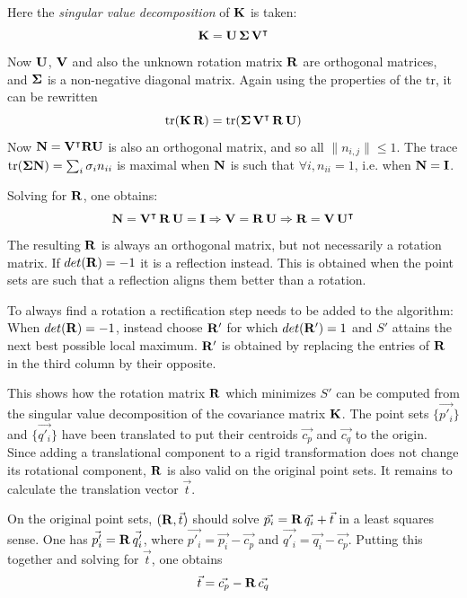 Here the \emph{singular value decomposition} of $\mathbf{K}$ is taken:
\begin{equation}
\mathbf{K} = \mathbf{U} \, \mathbf{\Sigma} \, \mathbf{V}^\intercal
\end{equation}
Now $\mathbf{U}$, $\mathbf{V}$ and also the unknown rotation matrix $\mathbf{R}$ are orthogonal matrices, and $\mathbf{\Sigma}$ is a non-negative diagonal matrix. Again using the properties of the $\text{tr}$, it can be rewritten
\begin{equation}
\text{tr}(\mathbf{K} \, \mathbf{R}) = \text{tr}(\mathbf{\Sigma} \, \mathbf{V}^\intercal \, \mathbf{R} \, \mathbf{U})
\end{equation}
Now $\mathbf{N} = \mathbf{V}^\intercal \mathbf{R} \mathbf{U}$ is also an orthogonal matrix, and so all $\| n_{i,j} \| \leq 1$. The trace $\text{tr}(\mathbf{\Sigma} \mathbf{N}) = \sum_{i} \sigma_i n_{ii}$ is maximal when $\mathbf{N}$ is such that $\forall i, n_{ii} = 1$, i.e. when $\mathbf{N} = \mathbf{I}$.

Solving for $\mathbf{R}$, one obtains:
\begin{equation}
\mathbf{N} = \mathbf{V}^\intercal \, \mathbf{R} \, \mathbf{U} = \mathbf{I}
\Rightarrow \mathbf{V} = \mathbf{R} \, \mathbf{U}
\Rightarrow \mathbf{R} = \mathbf{V} \, \mathbf{U}^\intercal
\end{equation}
The resulting $\mathbf{R}$ is always an orthogonal matrix, but not necessarily a rotation matrix. If $det(\mathbf{R}) = -1$ it is a reflection instead. This is obtained when the point sets are such that a reflection aligns them better than a rotation.

To always find a rotation a rectification step needs to be added to the algorithm: When $det(\mathbf{R}) = -1$, instead choose $\mathbf{R'}$ for which $det(\mathbf{R'}) = 1$ and $S'$ attains the next best possible local maximum. $\mathbf{R'}$ is obtained by replacing the entries of $\mathbf{R}$ in the third column by their opposite.

This shows how the rotation matrix $\mathbf{R}$ which minimizes $S'$ can be computed from the singular value decomposition of the covariance matrix $\mathbf{K}$. The point sets $\{ \vec{p'_i} \}$ and $\{ \vec{q'_i} \}$ have been translated to put their centroids $\vec{c_p}$ and $\vec{c_q}$ to the origin. Since adding a translational component to a rigid transformation does not change its rotational component, $\mathbf{R}$ is also valid on the original point sets. It remains to calculate the translation vector $\vec{t}$.

On the original point sets, $(\mathbf{R}, \vec{t})$ should solve $\vec{p_i} = \mathbf{R} \, \vec{q_i} + \vec{t}$ in a least squares sense. One has $\vec{p'_i} = \mathbf{R} \, \vec{q'_i}$, where $\vec{p'_i} = \vec{p_i} - \vec{c_p}$ and $\vec{q'_i} = \vec{q_i} - \vec{c_p}$. Putting this together and solving for $\vec{t}$, one obtains
\begin{equation}
\vec{t} = \vec{c_p} - \mathbf{R} \, \vec{c_q}
\end{equation}


